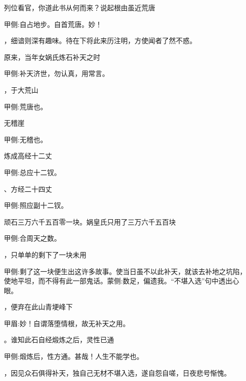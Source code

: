 \begin{parag}
    列位看官，你道此书从何而来？说起根由虽近荒唐
    \begin{note}甲侧:自占地步。自首荒唐。妙！\end{note}，细谙则深有趣味。待在下将此来历注明，方使闻者了然不惑。

\end{parag}


\begin{parag}
    原来，当年女娲氏炼石补天之时\begin{note}甲侧:补天济世，勿认真，用常言。\end{note}，于大荒山\begin{note}甲侧:荒唐也。\end{note}无稽崖\begin{note}甲侧:无稽也。\end{note}炼成高经十二丈\begin{note}甲侧:总应十二钗。\end{note}、方经二十四丈\begin{note}甲侧:照应副十二钗。\end{note}顽石三万六千五百零一块。娲皇氏只用了三万六千五百块\begin{note}甲侧:合周天之数。\end{note}，只单单的剩下了一块未用\begin{note}甲侧:剩了这一块便生出这许多故事。使当日虽不以此补天，就该去补地之坑陷，使地平坦，而不得有此一部鬼话。蒙侧:数足，偏遗我。“不堪入选”句中透出心眼。\end{note}，便弃在此山青埂峰下\begin{note}甲眉:妙！自谓落堕情根，故无补天之用。\end{note}。谁知此石自经煅炼之后，灵性已通\begin{note}甲侧:煅炼后，性方通。甚哉！人生不能学也。\end{note}，因见众石俱得补天，独自己无材不堪入选，遂自怨自嗟，日夜悲号惭愧。

\end{parag}



